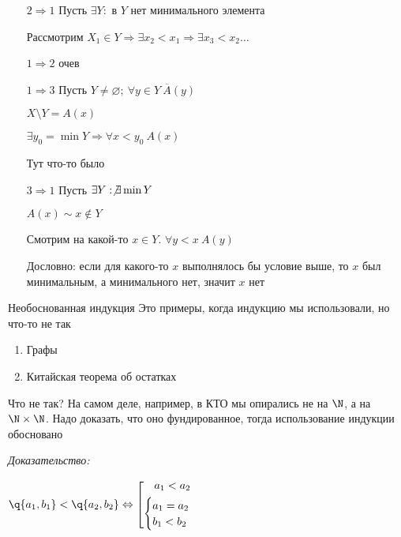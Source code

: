 \documentclass[12pt]{article}
\begin{document}
\begin{itemize}
    \item[$2 \Rightarrow 1$] Пусть $\exists Y :$ в $Y$ нет минимального элемента
    
    Рассмотрим $X_1 \in Y \Rightarrow \exists x_2 < x_1 \Rightarrow \exists x_3 < x_2 \ldots$

    \item[$1 \Rightarrow 2$] очев 
    
    \item[$1 \Rightarrow 3$] Пусть $Y \neq \varnothing;\ \forall y \in Y\ \overline{A}(y)$
    
    $X \setminus Y = A(x)$

    $\exists y_0 = \min Y \Rightarrow \forall x < y_0\ A(x)$

    Тут что-то было

    \item[$3 \Rightarrow 1$] Пусть $\exists Y : \not\exists \min Y$
    
    $A(x) \sim x \notin Y$

    Смотрим на какой-то $x \in Y$. $\forall y < x\ A(y)$

    Дословно: если для какого-то $x$ выполнялось бы условие выше, то $x$ был минимальным, а минимального нет, значит $x$ нет
\end{itemize}

\begin{nota}{Необоснованная индукция}
    Это примеры, когда индукцию мы использовали, но что-то не так

    \begin{enumerate}
        \item Графы
        \item Китайская теорема об остатках
    \end{enumerate}

    Что не так? На самом деле, например, в КТО мы опирались не на $\N$, а на $\N \times \N$. Надо доказать, что оно фундированное, тогда использование индукции обосновано
\end{nota}

\textit{Доказательство:}

$\q{a_1, b_1} < \q{a_2, b_2} \Leftrightarrow \left[ \begin{gathered}
    a_1 < a_2 \\
    \begin{cases}
        a_1 = a_2 \\
        b_1 < b_2
    \end{cases}
\end{gathered} \right.$
\end{document}
